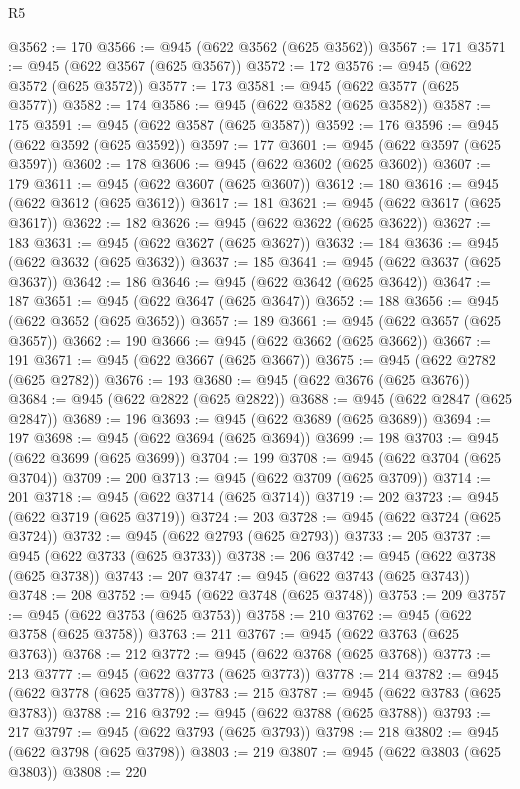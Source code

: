 \begin{lexlean}{R5}
\begin{coremodule}
@3562 := 170
@3566 := @945 (@622 @3562 (@625 @3562))
@3567 := 171
@3571 := @945 (@622 @3567 (@625 @3567))
@3572 := 172
@3576 := @945 (@622 @3572 (@625 @3572))
@3577 := 173
@3581 := @945 (@622 @3577 (@625 @3577))
@3582 := 174
@3586 := @945 (@622 @3582 (@625 @3582))
@3587 := 175
@3591 := @945 (@622 @3587 (@625 @3587))
@3592 := 176
@3596 := @945 (@622 @3592 (@625 @3592))
@3597 := 177
@3601 := @945 (@622 @3597 (@625 @3597))
@3602 := 178
@3606 := @945 (@622 @3602 (@625 @3602))
@3607 := 179
@3611 := @945 (@622 @3607 (@625 @3607))
@3612 := 180
@3616 := @945 (@622 @3612 (@625 @3612))
@3617 := 181
@3621 := @945 (@622 @3617 (@625 @3617))
@3622 := 182
@3626 := @945 (@622 @3622 (@625 @3622))
@3627 := 183
@3631 := @945 (@622 @3627 (@625 @3627))
@3632 := 184
@3636 := @945 (@622 @3632 (@625 @3632))
@3637 := 185
@3641 := @945 (@622 @3637 (@625 @3637))
@3642 := 186
@3646 := @945 (@622 @3642 (@625 @3642))
@3647 := 187
@3651 := @945 (@622 @3647 (@625 @3647))
@3652 := 188
@3656 := @945 (@622 @3652 (@625 @3652))
@3657 := 189
@3661 := @945 (@622 @3657 (@625 @3657))
@3662 := 190
@3666 := @945 (@622 @3662 (@625 @3662))
@3667 := 191
@3671 := @945 (@622 @3667 (@625 @3667))
@3675 := @945 (@622 @2782 (@625 @2782))
@3676 := 193
@3680 := @945 (@622 @3676 (@625 @3676))
@3684 := @945 (@622 @2822 (@625 @2822))
@3688 := @945 (@622 @2847 (@625 @2847))
@3689 := 196
@3693 := @945 (@622 @3689 (@625 @3689))
@3694 := 197
@3698 := @945 (@622 @3694 (@625 @3694))
@3699 := 198
@3703 := @945 (@622 @3699 (@625 @3699))
@3704 := 199
@3708 := @945 (@622 @3704 (@625 @3704))
@3709 := 200
@3713 := @945 (@622 @3709 (@625 @3709))
@3714 := 201
@3718 := @945 (@622 @3714 (@625 @3714))
@3719 := 202
@3723 := @945 (@622 @3719 (@625 @3719))
@3724 := 203
@3728 := @945 (@622 @3724 (@625 @3724))
@3732 := @945 (@622 @2793 (@625 @2793))
@3733 := 205
@3737 := @945 (@622 @3733 (@625 @3733))
@3738 := 206
@3742 := @945 (@622 @3738 (@625 @3738))
@3743 := 207
@3747 := @945 (@622 @3743 (@625 @3743))
@3748 := 208
@3752 := @945 (@622 @3748 (@625 @3748))
@3753 := 209
@3757 := @945 (@622 @3753 (@625 @3753))
@3758 := 210
@3762 := @945 (@622 @3758 (@625 @3758))
@3763 := 211
@3767 := @945 (@622 @3763 (@625 @3763))
@3768 := 212
@3772 := @945 (@622 @3768 (@625 @3768))
@3773 := 213
@3777 := @945 (@622 @3773 (@625 @3773))
@3778 := 214
@3782 := @945 (@622 @3778 (@625 @3778))
@3783 := 215
@3787 := @945 (@622 @3783 (@625 @3783))
@3788 := 216
@3792 := @945 (@622 @3788 (@625 @3788))
@3793 := 217
@3797 := @945 (@622 @3793 (@625 @3793))
@3798 := 218
@3802 := @945 (@622 @3798 (@625 @3798))
@3803 := 219
@3807 := @945 (@622 @3803 (@625 @3803))
@3808 := 220

\end{coremodule}
\end{lexlean}

